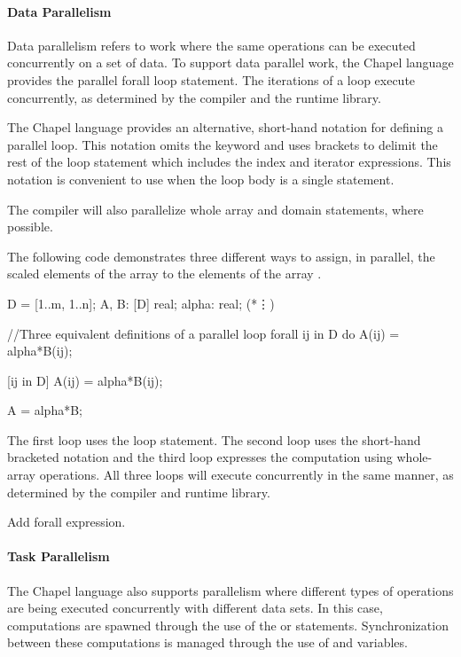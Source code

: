 \paragraph{Data Parallelism}
Data parallelism refers to work where the same operations can be executed 
concurrently on a set of data.  
To support data parallel work, the Chapel language provides the parallel 
{forall} loop statement.  The iterations of a  
loop execute concurrently, as determined by the compiler and the runtime
library.

The Chapel language provides an alternative, short-hand notation for 
defining a parallel loop.  This notation omits the  keyword
and uses brackets to delimit the rest of the loop statement which includes
the index and iterator expressions.  This notation is convenient to use
when the loop body is a single statement. 

The compiler will also parallelize whole array and domain statements, 
where possible.

\begin{example}
The following code demonstrates three different ways to assign,
in parallel, the scaled elements of the array  to the 
elements of the array .  
\begin{chapel}  
D = [1..m, 1..n];
A, B: [D] real;
alpha: real;
(*\vdots*)

//Three equivalent definitions of a parallel loop
forall ij in D do {
  A(ij) = alpha*B(ij);
} 

[ij in D] A(ij) = alpha*B(ij);

A = alpha*B;
\end{chapel}
The first loop uses the  loop statement.  The second
loop uses the short-hand bracketed notation and the third loop expresses
the computation using whole-array operations.  All three loops will
execute concurrently in the same manner, as determined by the compiler
and runtime library.
\end{example}

\begin{TODO}
Add forall expression.
\end{TODO}

\paragraph{Task Parallelism}
The Chapel language also supports parallelism where different types of
operations are being executed concurrently with different data sets.
In this case, computations are spawned through the use of the 
or  statements.  Synchronization between these computations
is managed through the use of  and
 variables.

